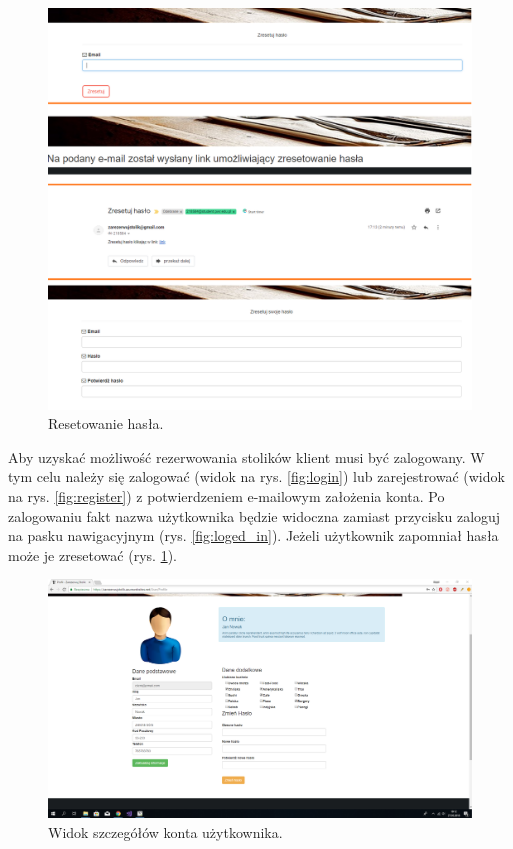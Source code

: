 \documentclass{article}
\begin{document}
\begin{figure}[H]
\centering
	\includegraphics[width=1.00\textwidth]{screens/reset.png}
	\caption[caption]{Resetowanie hasła.}
	\label{fig:reset}
\end{figure}

Aby uzyskać możliwość rezerwowania stolików klient musi być zalogowany. W tym celu należy się zalogować (widok na rys. \ref{fig:login}) lub zarejestrować (widok na rys. \ref{fig:register}) z potwierdzeniem e-mailowym założenia konta. Po zalogowaniu fakt nazwa użytkownika będzie widoczna zamiast przycisku zaloguj na pasku nawigacyjnym (rys. \ref{fig:loged_in}). Jeżeli użytkownik zapomniał hasła może je zresetować (rys. \ref{fig:reset}).

\begin{figure}[H]
\centering
	\includegraphics[width=1.00\textwidth]{screens/account_profile.png}
	\caption[caption]{Widok szczegółów konta użytkownika.}
	\label{fig:account_details}
\end{figure}
\end{document}

